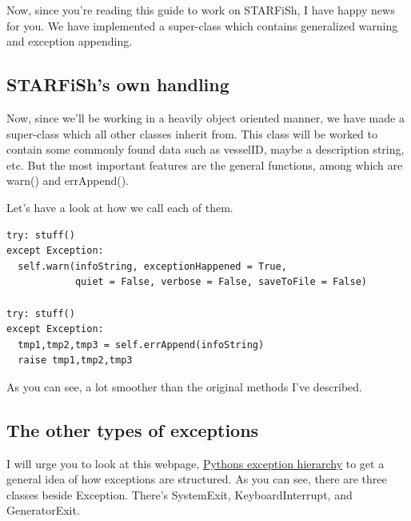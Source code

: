 \documentclass[10pt,a4paper]{article}
\begin{document}
Now, since you're reading this guide to work on STARFiSh, I have happy news for you. We have implemented a super-class which contains generalized warning and exception appending.

\subsection{STARFiSh's own handling}

Now, since we'll be working in a heavily object oriented manner, we have made a super-class which all other classes inherit from. This class will be worked to contain some commonly found data such as vesselID, maybe a description string, etc. But the most important features are the general functions, among which are warn() and errAppend().

Let's have a look at how we call each of them.

\begin{lstlisting}
try: stuff()
except Exception:
  self.warn(infoString, exceptionHappened = True, 
            quiet = False, verbose = False, saveToFile = False)

try: stuff()
except Exception:
  tmp1,tmp2,tmp3 = self.errAppend(infoString)
  raise tmp1,tmp2,tmp3
\end{lstlisting}

As you can see, a lot smoother than the original methods I've described.

\subsection{The other types of exceptions}

I will urge you to look at this webpage, \href{https://docs.python.org/2/library/exceptions.html\#exception-hierarchy}{Pythons exception hierarchy} to get a general idea of how exceptions are structured. As you can see, there are three classes beside Exception. There's SystemExit, KeyboardInterrupt, and GeneratorExit. 
\end{document}
